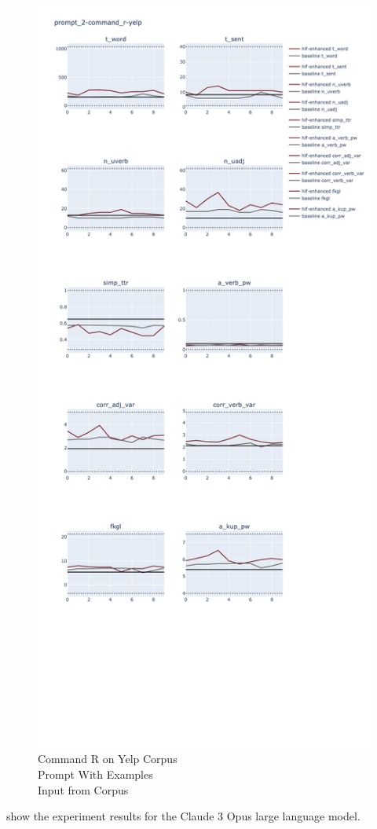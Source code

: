 \documentclass[11pt]{article}
\begin{document}
\begin{figure}[ht]
    \includegraphics[width=\textwidth,height=0.9\textheight,scale=1]{plots/prompt_2_ifd/prompt_2-command_r-yelp/prompt_2-command_r-yelp.png}
    \caption{Command R on Yelp Corpus\\Prompt With Examples\\Input from Corpus}\label{fig:command_r-prompt2-yelp-ifd}
\end{figure}

show the experiment results for the Claude 3 Opus large language model.
\end{document}
